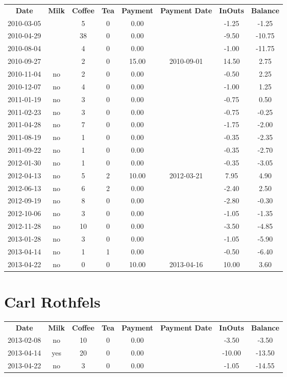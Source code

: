 \begin{center}
\begin{tabular}{cccccccc}
\textbf{Date} & \textbf{Milk} & \textbf{Coffee} & \textbf{Tea} & \textbf{Payment} & \textbf{Payment Date} & \textbf{InOuts} & \textbf{Balance} \\
2010-03-05 &  &  5 & 0 &  0.00 &  & -1.25 &  -1.25\\ 
2010-04-29 &  & 38 & 0 &  0.00 &  & -9.50 & -10.75\\ 
2010-08-04 &  &  4 & 0 &  0.00 &  & -1.00 & -11.75\\ 
2010-09-27 &  &  2 & 0 & 15.00 & 2010-09-01 & 14.50 &   2.75\\ 
2010-11-04 & no &  2 & 0 &  0.00 &  & -0.50 &   2.25\\ 
2010-12-07 & no &  4 & 0 &  0.00 &  & -1.00 &   1.25\\ 
2011-01-19 & no &  3 & 0 &  0.00 &  & -0.75 &   0.50\\ 
2011-02-23 & no &  3 & 0 &  0.00 &  & -0.75 &  -0.25\\ 
2011-04-28 & no &  7 & 0 &  0.00 &  & -1.75 &  -2.00\\ 
2011-08-19 & no &  1 & 0 &  0.00 &  & -0.35 &  -2.35\\ 
2011-09-22 & no &  1 & 0 &  0.00 &  & -0.35 &  -2.70\\ 
2012-01-30 & no &  1 & 0 &  0.00 &  & -0.35 &  -3.05\\ 
2012-04-13 & no &  5 & 2 & 10.00 & 2012-03-21 &  7.95 &   4.90\\ 
2012-06-13 & no &  6 & 2 &  0.00 &  & -2.40 &   2.50\\ 
2012-09-19 & no &  8 & 0 &  0.00 &  & -2.80 &  -0.30\\ 
2012-10-06 & no &  3 & 0 &  0.00 &  & -1.05 &  -1.35\\ 
2012-11-28 & no & 10 & 0 &  0.00 &  & -3.50 &  -4.85\\ 
2013-01-28 & no &  3 & 0 &  0.00 &  & -1.05 &  -5.90\\ 
2013-04-14 & no &  1 & 1 &  0.00 &  & -0.50 &  -6.40\\ 
2013-04-22 & no &  0 & 0 & 10.00 & 2013-04-16 & 10.00 &   3.60
\end{tabular}
\end{center}

\section{Carl Rothfels}

\begin{center}
\begin{tabular}{cccccccc}
\textbf{Date} & \textbf{Milk} & \textbf{Coffee} & \textbf{Tea} & \textbf{Payment} & \textbf{Payment Date} & \textbf{InOuts} & \textbf{Balance} \\
2013-02-08 & no & 10 & 0 & 0.00 &  &  -3.50 &  -3.50\\ 
2013-04-14 & yes & 20 & 0 & 0.00 &  & -10.00 & -13.50\\ 
2013-04-22 & no &  3 & 0 & 0.00 &  &  -1.05 & -14.55
\end{tabular}
\end{center}

